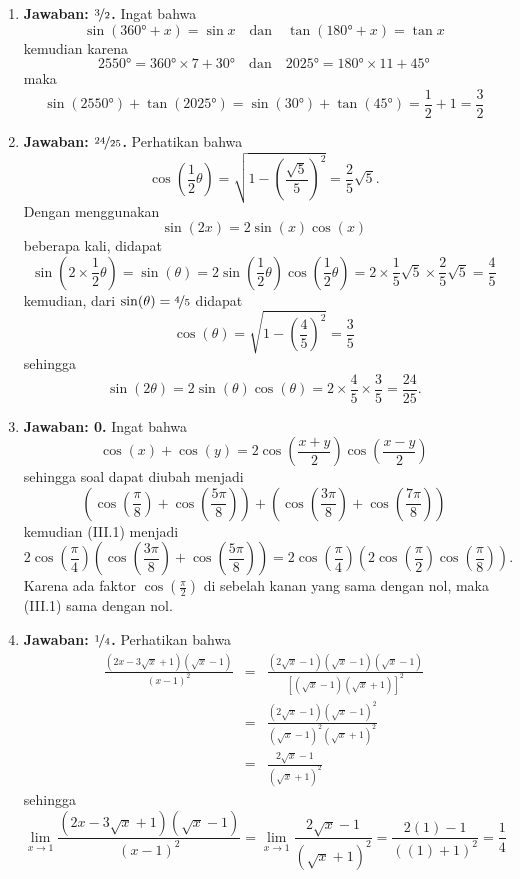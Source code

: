 \begin{enumerate}
\item \textbf{Jawaban: $\nicefrac{3}{2}$.} Ingat bahwa $$\sin(\ang{360} + x) = \sin x\quad\text{dan}\quad\tan(\ang{180} +x) = \tan x$$kemudian karena$$\ang{2550} = \ang{360}\times7 + \ang{30}\quad\text{dan}\quad\ang{2025} = \ang{180}\times11 + \ang{45}$$maka$$\sin(\ang{2550}) + \tan(\ang{2025}) = \sin(\ang{30}) + \tan(\ang{45}) = \frac{1}{2} + 1 = \frac{3}{2}$$

\item \textbf{Jawaban: $\nicefrac{24}{25}$.} Perhatikan bahwa $$\cos\left(\frac{1}{2}\theta\right) = \sqrt{1-\left(\frac{\sqrt{5}}{5}\right)^2} = \frac{2}{5}\sqrt{5}.$$ Dengan menggunakan $$\sin(2x) = 2\sin(x)\cos(x)$$ beberapa kali, didapat $$\sin\left(2\times\frac{1}{2}\theta\right) = \sin(\theta) =2\sin\left(\frac{1}{2}\theta\right)\cos\left(\frac{1}{2}\theta\right) = 2\times\frac{1}{5}\sqrt{5}\times\frac{2}{5}\sqrt{5} = \frac{4}{5}$$kemudian, dari $\sin(\theta) = \nicefrac{4}{5}$ didapat $$\cos(\theta) = \sqrt{1-\left(\frac{4}{5}\right)^2} = \frac{3}{5}$$sehingga $$\sin(2\theta) = 2\sin(\theta)\cos(\theta) = 2\times\frac{4}{5}\times\frac{3}{5} = \frac{24}{25}.$$

\item \textbf{Jawaban: 0.} Ingat bahwa $$\cos(x) + \cos(y) = 2\cos\left(\frac{x+y}{2}\right)\cos\left(\frac{x-y}{2}\right)$$sehingga soal dapat diubah menjadi \setcounter{equation}{0}\begin{equation}\left(\cos\left(\frac{\pi}{8}\right) + \cos\left(\frac{5\pi}{8}\right)\right) + \left(\cos\left(\frac{3\pi}{8}\right)+\cos\left(\frac{7\pi}{8}\right)\right)\end{equation}kemudian (III.1) menjadi
	$$
	2\cos\left(\frac{\pi}{4}\right)\left(\cos\left(\frac{3\pi}{8}\right)+\cos\left(\frac{5\pi}{8}\right)\right)=2\cos\left(\frac{\pi}{4}\right)\left(2\cos\left(\frac{\pi}{2}\right)						\cos\left(\frac{\pi}{8}\right)\right).
	$$
Karena ada faktor $\cos\left(\frac{\pi}{2}\right)$ di sebelah kanan yang sama dengan nol, maka (III.1) sama dengan nol.

\item \textbf{Jawaban: $\nicefrac{1}{4}$.} Perhatikan bahwa
\begin{eqnarray*}
\frac{(2x-3\sqrt{x} +1)(\sqrt{x}-1)}{(x-1)^2} &=& \frac{(2\sqrt{x}-1)(\sqrt{x}-1)(\sqrt{x}-1)}{\left[(\sqrt{x}-1)(\sqrt{x}+1)\right]^2}\\
							 &=& \frac{(2\sqrt{x}-1)(\sqrt{x}-1)^2}{(\sqrt{x}-1)^2(\sqrt{x}+1)^2}\\
							 &=& \frac{2\sqrt{x}-1}{(\sqrt{x}+1)^2}
\end{eqnarray*}
sehingga $$\lim_{x\to1}\frac{(2x-3\sqrt{x} +1)(\sqrt{x}-1)}{(x-1)^2} = \lim_{x\to1}\frac{2\sqrt{x}-1}{(\sqrt{x}+1)^2} = \frac{2(1)-1}{((1)+1)^2} = \frac{1}{4}$$


\end{enumerate}
